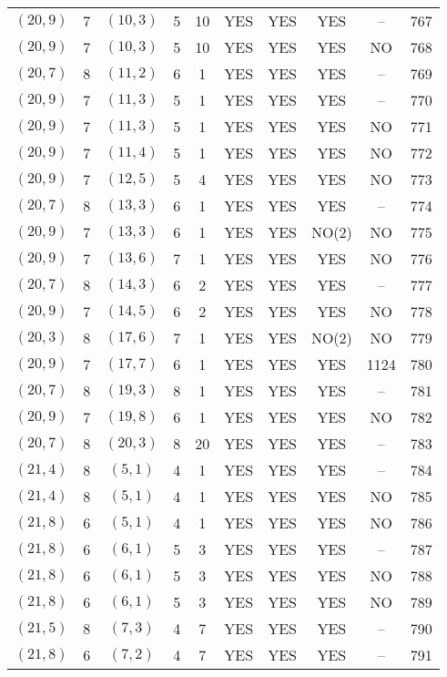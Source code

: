 \begin{longtable}{|c|c|c|c|c|c|c|c|c|c|}
$(20, 9)$ & 7 & $(10, 3)$ & 5 & 10 & YES & YES & YES & -- & 767\\
$(20, 9)$ & 7 & $(10, 3)$ & 5 & 10 & YES & YES & YES & NO & 768\\
$(20, 7)$ & 8 & $(11, 2)$ & 6 & 1 & YES & YES & YES & -- & 769\\
$(20, 9)$ & 7 & $(11, 3)$ & 5 & 1 & YES & YES & YES & -- & 770\\
$(20, 9)$ & 7 & $(11, 3)$ & 5 & 1 & YES & YES & YES & NO & 771\\
$(20, 9)$ & 7 & $(11, 4)$ & 5 & 1 & YES & YES & YES & NO & 772\\
$(20, 9)$ & 7 & $(12, 5)$ & 5 & 4 & YES & YES & YES & NO & 773\\
$(20, 7)$ & 8 & $(13, 3)$ & 6 & 1 & YES & YES & YES & -- & 774\\
$(20, 9)$ & 7 & $(13, 3)$ & 6 & 1 & YES & YES & NO(2) & NO & 775\\
$(20, 9)$ & 7 & $(13, 6)$ & 7 & 1 & YES & YES & YES & NO & 776\\
$(20, 7)$ & 8 & $(14, 3)$ & 6 & 2 & YES & YES & YES & -- & 777\\
$(20, 9)$ & 7 & $(14, 5)$ & 6 & 2 & YES & YES & YES & NO & 778\\
$(20, 3)$ & 8 & $(17, 6)$ & 7 & 1 & YES & YES & NO(2) & NO & 779\\
$(20, 9)$ & 7 & $(17, 7)$ & 6 & 1 & YES & YES & YES & 1124 & 780\\
$(20, 7)$ & 8 & $(19, 3)$ & 8 & 1 & YES & YES & YES & -- & 781\\
$(20, 9)$ & 7 & $(19, 8)$ & 6 & 1 & YES & YES & YES & NO & 782\\
$(20, 7)$ & 8 & $(20, 3)$ & 8 & 20 & YES & YES & YES & -- & 783\\
$(21, 4)$ & 8 & $(5, 1)$ & 4 & 1 & YES & YES & YES & -- & 784\\
$(21, 4)$ & 8 & $(5, 1)$ & 4 & 1 & YES & YES & YES & NO & 785\\
$(21, 8)$ & 6 & $(5, 1)$ & 4 & 1 & YES & YES & YES & NO & 786\\
$(21, 8)$ & 6 & $(6, 1)$ & 5 & 3 & YES & YES & YES & -- & 787\\
$(21, 8)$ & 6 & $(6, 1)$ & 5 & 3 & YES & YES & YES & NO & 788\\
$(21, 8)$ & 6 & $(6, 1)$ & 5 & 3 & YES & YES & YES & NO & 789\\
$(21, 5)$ & 8 & $(7, 3)$ & 4 & 7 & YES & YES & YES & -- & 790\\
$(21, 8)$ & 6 & $(7, 2)$ & 4 & 7 & YES & YES & YES & -- & 791\\

\end{longtable}
